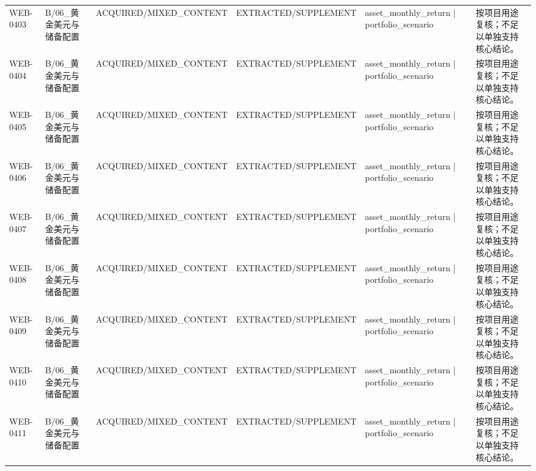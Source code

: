 \begin{landscape}
\begin{longtable}{p{1.8cm}p{2.6cm}p{2.6cm}p{2.6cm}p{4.8cm}p{7.2cm}}
WEB-0403 & B/\allowbreak{}06\_\allowbreak{}黄金美元与储备配置 & ACQUIRED/\allowbreak{}MIXED\_\allowbreak{}CONTENT & EXTRACTED/\allowbreak{}SUPPLEMENT & asset\_\allowbreak{}monthly\_\allowbreak{}return | portfolio\_\allowbreak{}scenario & 按项目用途复核；不足以单独支持核心结论。\\
WEB-0404 & B/\allowbreak{}06\_\allowbreak{}黄金美元与储备配置 & ACQUIRED/\allowbreak{}MIXED\_\allowbreak{}CONTENT & EXTRACTED/\allowbreak{}SUPPLEMENT & asset\_\allowbreak{}monthly\_\allowbreak{}return | portfolio\_\allowbreak{}scenario & 按项目用途复核；不足以单独支持核心结论。\\
WEB-0405 & B/\allowbreak{}06\_\allowbreak{}黄金美元与储备配置 & ACQUIRED/\allowbreak{}MIXED\_\allowbreak{}CONTENT & EXTRACTED/\allowbreak{}SUPPLEMENT & asset\_\allowbreak{}monthly\_\allowbreak{}return | portfolio\_\allowbreak{}scenario & 按项目用途复核；不足以单独支持核心结论。\\
WEB-0406 & B/\allowbreak{}06\_\allowbreak{}黄金美元与储备配置 & ACQUIRED/\allowbreak{}MIXED\_\allowbreak{}CONTENT & EXTRACTED/\allowbreak{}SUPPLEMENT & asset\_\allowbreak{}monthly\_\allowbreak{}return | portfolio\_\allowbreak{}scenario & 按项目用途复核；不足以单独支持核心结论。\\
WEB-0407 & B/\allowbreak{}06\_\allowbreak{}黄金美元与储备配置 & ACQUIRED/\allowbreak{}MIXED\_\allowbreak{}CONTENT & EXTRACTED/\allowbreak{}SUPPLEMENT & asset\_\allowbreak{}monthly\_\allowbreak{}return | portfolio\_\allowbreak{}scenario & 按项目用途复核；不足以单独支持核心结论。\\
WEB-0408 & B/\allowbreak{}06\_\allowbreak{}黄金美元与储备配置 & ACQUIRED/\allowbreak{}MIXED\_\allowbreak{}CONTENT & EXTRACTED/\allowbreak{}SUPPLEMENT & asset\_\allowbreak{}monthly\_\allowbreak{}return | portfolio\_\allowbreak{}scenario & 按项目用途复核；不足以单独支持核心结论。\\
WEB-0409 & B/\allowbreak{}06\_\allowbreak{}黄金美元与储备配置 & ACQUIRED/\allowbreak{}MIXED\_\allowbreak{}CONTENT & EXTRACTED/\allowbreak{}SUPPLEMENT & asset\_\allowbreak{}monthly\_\allowbreak{}return | portfolio\_\allowbreak{}scenario & 按项目用途复核；不足以单独支持核心结论。\\
WEB-0410 & B/\allowbreak{}06\_\allowbreak{}黄金美元与储备配置 & ACQUIRED/\allowbreak{}MIXED\_\allowbreak{}CONTENT & EXTRACTED/\allowbreak{}SUPPLEMENT & asset\_\allowbreak{}monthly\_\allowbreak{}return | portfolio\_\allowbreak{}scenario & 按项目用途复核；不足以单独支持核心结论。\\
WEB-0411 & B/\allowbreak{}06\_\allowbreak{}黄金美元与储备配置 & ACQUIRED/\allowbreak{}MIXED\_\allowbreak{}CONTENT & EXTRACTED/\allowbreak{}SUPPLEMENT & asset\_\allowbreak{}monthly\_\allowbreak{}return | portfolio\_\allowbreak{}scenario & 按项目用途复核；不足以单独支持核心结论。\\

\end{longtable}
\end{landscape}
